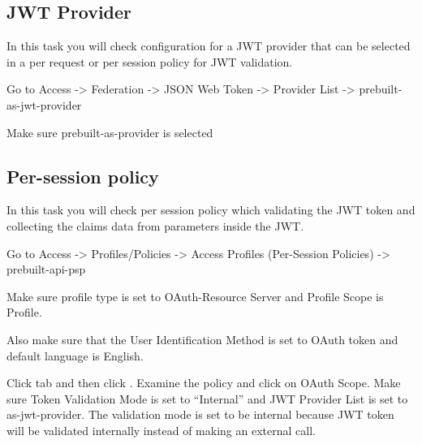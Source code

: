 \documentclass[letterpaper,10pt,english]{sphinxmanual}
\begin{document}
\subsection{JWT Provider}
\label{\detokenize{class2/module1/module1:jwt-provider}}
In this task you will check configuration for a JWT provider that can be selected in a per request or per session policy for JWT validation.

Go to Access -\textgreater{} Federation -\textgreater{} JSON Web Token -\textgreater{} Provider List -\textgreater{} prebuilt-as-jwt-provider

Make sure prebuilt-as-provider is selected
\begin{quote}

\noindent{}
\end{quote}


\subsection{Per-session policy}
\label{\detokenize{class2/module1/module1:per-session-policy}}
In this task you will check per session policy which validating the
JWT token and collecting the claims data from parameters inside the JWT.

Go to Access -\textgreater{} Profiles/Policies -\textgreater{} Access Profiles (Per-Session Policies) -\textgreater{} prebuilt-api-psp

Make sure profile type is set to OAuth-Resource Server and Profile Scope is Profile.
\begin{quote}

\noindent{}
\end{quote}

Also make sure that the User Identification Method is set to OAuth token and default language is English.
\begin{quote}

\noindent{}
\end{quote}

Click  tab and then click . Examine the policy and click on OAuth Scope.
Make sure Token Validation Mode is set to “Internal” and JWT Provider List is set to as-jwt-provider. The validation mode is set to be internal because JWT token will be validated internally instead of making an external call.
\begin{quote}

\noindent{}
\end{quote}
\end{document}
